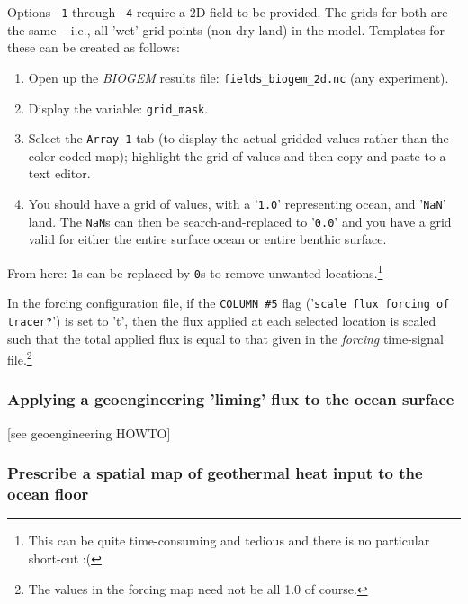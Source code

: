 Options \texttt{-1} through \texttt{-4} require a 2D field to be provided. The grids for both are the same -- i.e., all 'wet' grid points (non dry land) in the model. Templates for these can be created as follows:

\begin{enumerate}[noitemsep]
\vspace{1mm}
\item Open up the \textit{BIOGEM} results file: \texttt{fields\_biogem\_2d.nc} (any experiment).
\vspace{1mm}
\item Display the variable: \texttt{grid\_mask}.
\vspace{1mm}
\item Select the \texttt{Array 1} tab (to display the actual gridded values rather than the color-coded map); highlight the grid of values and then copy-and-paste to a text editor.
\vspace{1mm}
\item You should have a grid of values, with a '\texttt{1.0}' representing ocean, and '\texttt{NaN}' land. The \texttt{NaN}s can then be search-and-replaced to '\texttt{0.0}' and you have a grid valid for either the entire surface ocean or entire benthic surface.
\end{enumerate}

From here: \texttt{1}s can be replaced by \texttt{0}s to remove unwanted locations.\footnote{This can be quite time-consuming and tedious and there is no particular short-cut :(}

In the forcing configuration file, if the \texttt{COLUMN \#5} flag ('\texttt{scale flux forcing of tracer?}') is set to 't', then the flux applied at each selected location is scaled such that the total applied flux is equal to that given in the \textit{forcing} time-signal file.\footnote{The values in the forcing map need not be all 1.0 of course.}

%
\newpage
\subsubsection{Applying a geoengineering 'liming' flux to the ocean surface}

\vspace{1mm}
[see geoengineering HOWTO]

%
\newpage
\subsubsection{Prescribe a spatial map of geothermal heat input to the ocean floor}
\vspace{2mm}

